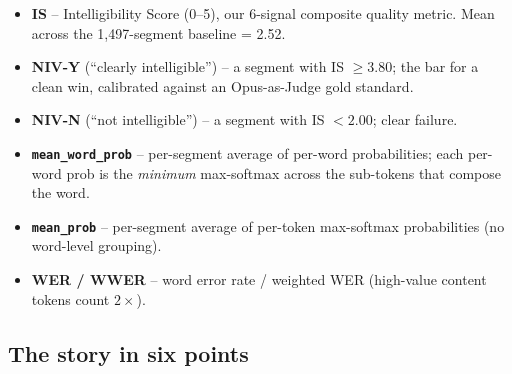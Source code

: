 \documentclass[11pt, a4paper]{article}
\begin{document}
\begin{itemize}[leftmargin=*]
  \item \textbf{IS} -- Intelligibility Score (0--5), our 6-signal composite quality metric. Mean across the 1{,}497-segment baseline = 2.52.
  \item \textbf{NIV-Y} (``clearly intelligible'') -- a segment with IS $\ge 3.80$; the bar for a clean win, calibrated against an Opus-as-Judge gold standard.
  \item \textbf{NIV-N} (``not intelligible'') -- a segment with IS $< 2.00$; clear failure.
  \item \texttt{\textbf{mean\_word\_prob}} -- per-segment average of per-word probabilities; each per-word prob is the \emph{minimum} max-softmax across the sub-tokens that compose the word.
  \item \texttt{\textbf{mean\_prob}} -- per-segment average of per-token max-softmax probabilities (no word-level grouping).
  \item \textbf{WER / WWER} -- word error rate / weighted WER (high-value content tokens count $2\times$).
\end{itemize}

\subsection*{The story in six points}
\end{document}
